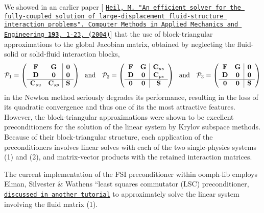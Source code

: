 We showed in an earlier paper \mbox{[} \href{http://www.sciencedirect.com/science?_ob=ArticleURL&_udi=B6V29-4B5C1C6-1&_user=494590&_rdoc=1&_fmt=&_orig=search&_sort=d&view=c&_acct=C000024058&_version=1&_urlVersion=0&_userid=494590&md5=1ed12ccb0a1535610fb2d11dca48a4e3}{\tt Heil, M. "An efficient solver for the fully-\/coupled solution of large-\/displacement fluid-\/structure interaction problems". Computer Methods in Applied Mechanics and Engineering {\bfseries 193}, 1-\/23, (2004)}\mbox{]} that the use of block-\/triangular approximations to the global Jacobian matrix, obtained by neglecting the fluid-\/solid or solid-\/fluid interaction blocks, \[ {\cal P}_1 = \left( \begin{array}{cc|c} {\bf F} & {\bf G} & {\bf 0} \\ {\bf D} & {\bf 0} & {\bf 0} \\ \hline {\bf C}_{su} & {\bf C}_{sp} & {\bf S} \end{array} \right) \mbox{\ \ and \ \ } {\cal P}_2 = \left( \begin{array}{cc|c} {\bf F} & {\bf G} & {\bf C}_{us} \\ {\bf D} & {\bf 0} & {\bf C}_{ps} \\ \hline {\bf 0} & {\bf 0} & {\bf S} \end{array} \right) \mbox{\ \ and \ \ } {\cal P}_3 = \left( \begin{array}{cc|c} {\bf F} & {\bf G} & {\bf 0} \\ {\bf D} & {\bf 0} & {\bf 0} \\ \hline {\bf 0} & {\bf 0} & {\bf S} \end{array} \right) \] in the Newton method seriously degrades its performance, resulting in the loss of its quadratic convergence and thus one of its the most attractive features. However, the block-\/triangular approximations were shown to be excellent preconditioners for the solution of the linear system by Krylov subspace methods. Because of their block-\/triangular structure, each application of the preconditioners involves linear solves with each of the two single-\/physics systems (1) and (2), and matrix-\/vector products with the retained interaction matrices.

The current implementation of the F\+SI preconditioner within {\ttfamily oomph-\/lib} employs Elman, Silvester \& Wathen\textquotesingle{}s ``least squares commutator\textquotesingle{}\textquotesingle{} (L\+SC) preconditioner, \href{../../lsc_navier_stokes/html/index.html}{\tt discussed in another tutorial} to approximately solve the linear system involving the fluid matrix (1).



